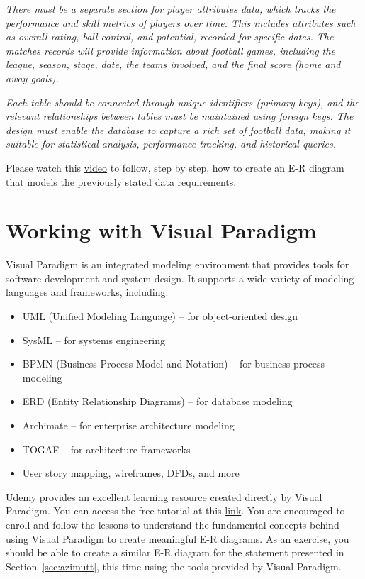 \documentclass{article}
\begin{document}
\textit{There must be a separate section for player attributes data, which tracks the performance and skill metrics of players over time. This includes attributes such as overall rating, ball control, and potential, recorded for specific dates. The matches records will provide information about football games, including the league, season, stage, date, the teams involved, and the final score (home and away goals).}

\textit{Each table should be connected through unique identifiers (primary keys), and the relevant relationships between tables must be maintained using foreign keys. The design must enable the database to capture a rich set of football data, making it suitable for statistical analysis, performance tracking, and historical queries.}

Please watch this \href{https://drive.google.com/file/d/1e4SKyzVyXFkjLNyx0BBZxJIGoPUVN3d2/view?usp=sharing}{video} to follow, step by step, how to create an E-R diagram that models the previously stated data requirements.

\section{Working with Visual Paradigm} \label{sec:visual}
Visual Paradigm is an integrated modeling environment that provides tools for software development and system design. It supports a wide variety of modeling languages and frameworks, including:

\begin{itemize}
    \item UML (Unified Modeling Language) – for object-oriented design
    \item SysML – for systems engineering
    \item BPMN (Business Process Model and Notation) – for business process modeling
    \item ERD (Entity Relationship Diagrams) – for database modeling
    \item Archimate – for enterprise architecture modeling
    \item TOGAF – for architecture frameworks
    \item User story mapping, wireframes, DFDs, and more
\end{itemize}

Udemy provides an excellent learning resource created directly by Visual Paradigm. You can access the free tutorial at this \href{https://www.udemy.com/course/visual-paradigm-essential}{link}. You are encouraged to enroll and follow the lessons to understand the fundamental concepts behind using Visual Paradigm to create meaningful E-R diagrams. As an exercise, you should be able to create a similar E-R diagram for the statement presented in Section~\ref{sec:azimutt}, this time using the tools provided by Visual Paradigm.
\end{document}

